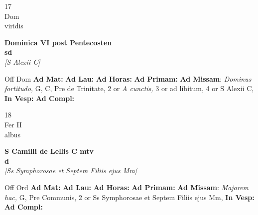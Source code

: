 \documentclass[10pt, openany]{book}
\begin{document}
    \begin{center}
        \begin{minipage}{3.5in}
            \vspace{2em}
            \begin{minipage}{0.5in}
                {\Huge 17} \\
                {\normalsize Dom} \\
                {\normalsize viridis}
            \end{minipage}
            \begin{minipage}{3.0in}
                \textbf{ \large Dominica VI post Pentecosten \\
                \textnormal{\normalsize sd}} \\ \textit{[S Alexii C]} \\ 
            \end{minipage}
            \begin{justify}Off Dom
                \textbf{Ad Mat: }
                \textbf{Ad Lau: }
                \textbf{Ad Horas: }
                \textbf{Ad Primam: }\textbf{Ad Missam}: \textit{Dominus fortitudo,} G, C, Pre de Trinitate, 2 or \textit{A cunctis,} 3 or ad libitum, 4 or S Alexii C,  
                \textbf{In Vesp: }
                \textbf{Ad Compl: }
            \end{justify}
        \end{minipage}
    \end{center}

    \begin{center}
        \begin{minipage}{3.5in}
            \vspace{2em}
            \begin{minipage}{0.5in}
                {\Huge 18} \\
                {\normalsize Fer II} \\
                {\normalsize albus}
            \end{minipage}
            \begin{minipage}{3.0in}
                \textbf{ \large S Camilli de Lellis C mtv \\
                \textnormal{\normalsize d}} \\ \textit{[Ss Symphorosae et Septem Filiis ejus Mm]} \\ 
            \end{minipage}
            \begin{justify}Off Ord
                \textbf{Ad Mat: }
                \textbf{Ad Lau: }
                \textbf{Ad Horas: }
                \textbf{Ad Primam: }\textbf{Ad Missam}: \textit{Majorem hac,} G, Pre Communis, 2 or Ss Symphorosae et Septem Filiis ejus Mm,  
                \textbf{In Vesp: }
                \textbf{Ad Compl: }
            \end{justify}
        \end{minipage}
    \end{center}
\end{document}
